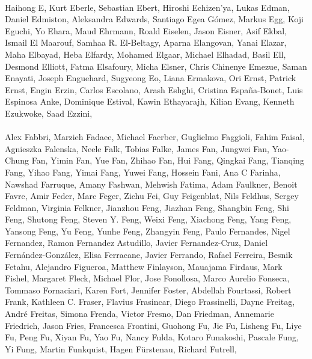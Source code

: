 \paragraph{}Haihong E, Kurt Eberle, Sebastian Ebert, Hiroshi Echizen'ya, Lukas Edman, Daniel Edmiston, Aleksandra Edwards, Santiago Egea Gómez, Markus Egg, Koji Eguchi, Yo Ehara, Maud Ehrmann, Roald Eiselen, Jason Eisner, Asif Ekbal, Ismail El Maarouf, Samhaa R. El-Beltagy, Aparna Elangovan, Yanai Elazar, Maha Elbayad, Heba Elfardy, Mohamed Elgaar, Michael Elhadad, Basil Ell, Desmond Elliott, Fatma Elsafoury, Micha Elsner, Chris Chinenye Emezue, Saman Enayati, Joseph Enguehard, Sugyeong Eo, Liana Ermakova, Ori Ernst, Patrick Ernst, Engin Erzin, Carlos Escolano, Arash Eshghi, Cristina España-Bonet, Luis Espinosa Anke, Dominique Estival, Kawin Ethayarajh, Kilian Evang, Kenneth Ezukwoke, Saad Ezzini,
\paragraph{}Alex Fabbri, Marzieh Fadaee, Michael Faerber, Guglielmo Faggioli, Fahim Faisal, Agnieszka Falenska, Neele Falk, Tobias Falke, James Fan, Jungwei Fan, Yao-Chung Fan, Yimin Fan, Yue Fan, Zhihao Fan, Hui Fang, Qingkai Fang, Tianqing Fang, Yihao Fang, Yimai Fang, Yuwei Fang, Hossein Fani, Ana C Farinha, Nawshad Farruque, Amany Fashwan, Mehwish Fatima, Adam Faulkner, Benoit Favre, Amir Feder, Marc Feger, Zichu Fei, Guy Feigenblat, Nils Feldhus, Sergey Feldman, Virginia Felkner, Jianzhou Feng, Jiazhan Feng, Shangbin Feng, Shi Feng, Shutong Feng, Steven Y. Feng, Weixi Feng, Xiachong Feng, Yang Feng, Yansong Feng, Yu Feng, Yunhe Feng, Zhangyin Feng, Paulo Fernandes, Nigel Fernandez, Ramon Fernandez Astudillo, Javier Fernandez-Cruz, Daniel Fernández-González, Elisa Ferracane, Javier Ferrando, Rafael Ferreira, Besnik Fetahu, Alejandro Figueroa, Matthew Finlayson, Mauajama Firdaus, Mark Fishel, Margaret Fleck, Michael Flor, Jose Fonollosa, Marco Aurelio Fonseca, Tommaso Fornaciari, Karen Fort, Jennifer Foster, Abdellah Fourtassi, Robert Frank, Kathleen C. Fraser, Flavius Frasincar, Diego Frassinelli, Dayne Freitag, André Freitas, Simona Frenda, Victor Fresno, Dan Friedman, Annemarie Friedrich, Jason Fries, Francesca Frontini, Guohong Fu, Jie Fu, Lisheng Fu, Liye Fu, Peng Fu, Xiyan Fu, Yao Fu, Nancy Fulda, Kotaro Funakoshi, Pascale Fung, Yi Fung, Martin Funkquist, Hagen Fürstenau, Richard Futrell,
